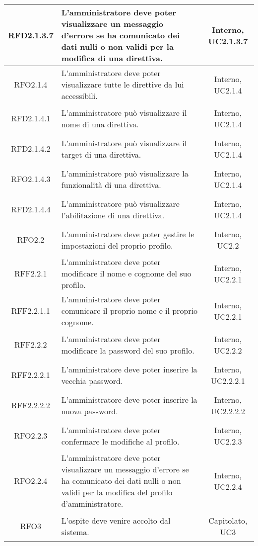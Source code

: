 \begin{longtable}{|c|>{\centering}m{7cm}|c|}
\hypertarget{RFD2.1.3.7}{RFD2.1.3.7} & L'amministratore deve poter visualizzare un messaggio d'errore se ha comunicato dei dati nulli o non validi per la modifica di una direttiva. & Interno, UC2.1.3.7\\ \hline
\hypertarget{RFO2.1.4}{RFO2.1.4} & L'amministratore deve poter visualizzare tutte le direttive da lui accessibili. & Interno, UC2.1.4\\ \hline
\hypertarget{RFD2.1.4.1}{RFD2.1.4.1} & L'amministratore può visualizzare il nome di una direttiva. & Interno, UC2.1.4\\ \hline
\hypertarget{RFD2.1.4.2}{RFD2.1.4.2} & L'amministratore può visualizzare il target di una direttiva. & Interno, UC2.1.4\\ \hline
\hypertarget{RFO2.1.4.3}{RFO2.1.4.3} & L'amministratore può visualizzare la funzionalità di una direttiva. & Interno, UC2.1.4\\ \hline
\hypertarget{RFD2.1.4.4}{RFD2.1.4.4} & L'amministratore può visualizzare l'abilitazione di una direttiva. & Interno, UC2.1.4\\ \hline
\hypertarget{RFO2.2}{RFO2.2} & L'amministratore deve poter gestire le impostazioni del proprio profilo. & Interno, UC2.2\\ \hline
\hypertarget{RFF2.2.1}{RFF2.2.1} & L'amministratore deve poter modificare il nome e cognome del suo profilo. & Interno, UC2.2.1\\ \hline
\hypertarget{RFF2.2.1.1}{RFF2.2.1.1} & L'amministratore deve poter comunicare il proprio nome e il proprio cognome. & Interno, UC2.2.1\\ \hline
\hypertarget{RFF2.2.2}{RFF2.2.2} & L'amministratore deve poter modificare la password del suo profilo. & Interno, UC2.2.2\\ \hline
\hypertarget{RFF2.2.2.1}{RFF2.2.2.1} & L'amministratore deve poter inserire la vecchia password. & Interno, UC2.2.2.1\\ \hline
\hypertarget{RFF2.2.2.2}{RFF2.2.2.2} & L'amministratore deve poter inserire la nuova password. & Interno, UC2.2.2.2\\ \hline
\hypertarget{RFO2.2.3}{RFO2.2.3} & L'amministratore deve poter confermare le modifiche al profilo. & Interno, UC2.2.3\\ \hline
\hypertarget{RFO2.2.4}{RFO2.2.4} & L'amministratore deve poter visualizzare un messaggio d'errore se ha comunicato dei dati nulli o non validi per la modifica del profilo d'amministratore. & Interno, UC2.2.4\\ \hline
\hypertarget{RFO3}{RFO3} & L'ospite deve venire accolto dal sistema. & Capitolato, UC3\\ \hline

\end{longtable}
